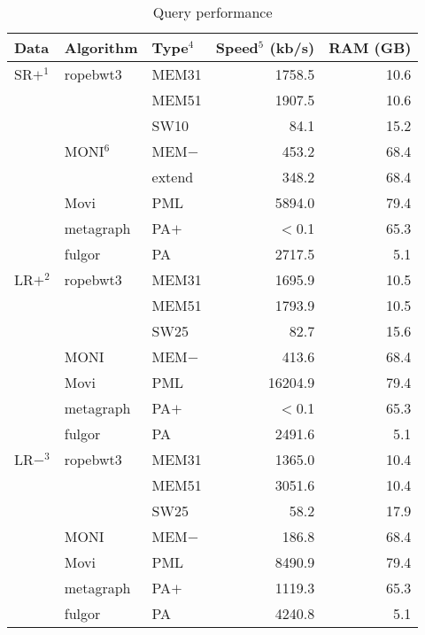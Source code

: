 \documentclass[webpdf,contemporary,large,namedate]{oup-authoring-template}%
\begin{document}
\begin{table}[!tb]
\caption{Query performance\label{tab:query}}
\begin{tabular*}{\columnwidth}{@{\extracolsep\fill}lllrr@{\extracolsep\fill}}
\toprule
Data   & Algorithm     &Type$^4$&Speed$^5$ (kb/s)&RAM (GB) \\
\midrule
SR$+^1$& ropebwt3      & MEM31  & 1758.5       &  10.6 \\
       &               & MEM51  & 1907.5       &  10.6 \\
	   &               & SW10   & 84.1         &  15.2 \\
	   & MONI$^6$      & MEM$-$ & 453.2        &  68.4 \\
	   &               & extend & 348.2        &  68.4 \\
       & Movi          & PML    & 5894.0       &  79.4 \\
	   & metagraph     & PA$+$  & $<$0.1       &  65.3 \\
	   & fulgor        & PA     & 2717.5       &   5.1 \\
LR$+^2$& ropebwt3      & MEM31  & 1695.9       &  10.5 \\
       &               & MEM51  & 1793.9       &  10.5 \\
       &               & SW25   & 82.7         &  15.6 \\
	   & MONI          & MEM$-$ & 413.6        &  68.4 \\
	   & Movi          & PML    & 16204.9      &  79.4 \\
	   & metagraph     & PA$+$  & $<$0.1       &  65.3 \\
	   & fulgor        & PA     & 2491.6       &   5.1 \\
LR$-^3$& ropebwt3      & MEM31  & 1365.0       &  10.4 \\
       &               & MEM51  & 3051.6       &  10.4 \\
	   &               & SW25   & 58.2         &  17.9 \\
	   & MONI          & MEM$-$ & 186.8        &  68.4 \\
	   & Movi          & PML    & 8490.9       &  79.4 \\
	   & metagraph     & PA$+$  & 1119.3       &  65.3 \\
	   & fulgor        & PA     & 4240.8       &   5.1 \\

\end{tabular*}
\end{table}
\end{document}
